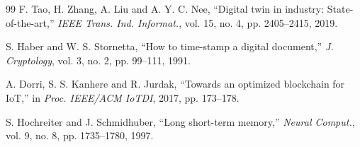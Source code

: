 \documentclass[conference]{IEEEtran}
\begin{document}
\begin{thebibliography}{99}
 F. Tao, H. Zhang, A. Liu and A. Y. C. Nee, ``Digital twin in industry: State-of-the-art,'' \emph{IEEE Trans. Ind. Informat.}, vol. 15, no. 4, pp. 2405--2415, 2019.

 S. Haber and W. S. Stornetta, ``How to time-stamp a digital document,'' \emph{J. Cryptology}, vol. 3, no. 2, pp. 99--111, 1991.

 A. Dorri, S. S. Kanhere and R. Jurdak, ``Towards an optimized blockchain for IoT,'' in \emph{Proc. IEEE/ACM IoTDI}, 2017, pp. 173--178.

 S. Hochreiter and J. Schmidhuber, ``Long short-term memory,'' \emph{Neural Comput.}, vol. 9, no. 8, pp. 1735--1780, 1997.

\end{thebibliography}
\end{document}
